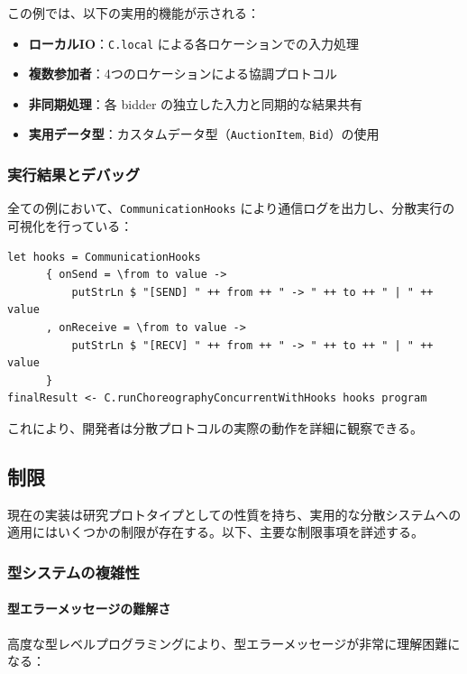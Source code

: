 この例では、以下の実用的機能が示される：
\begin{itemize}
\item \textbf{ローカルIO}：\texttt{C.local} による各ロケーションでの入力処理
\item \textbf{複数参加者}：4つのロケーションによる協調プロトコル
\item \textbf{非同期処理}：各 bidder の独立した入力と同期的な結果共有
\item \textbf{実用データ型}：カスタムデータ型（\texttt{AuctionItem}, \texttt{Bid}）の使用
\end{itemize}

\subsubsection{実行結果とデバッグ}

全ての例において、\texttt{CommunicationHooks} により通信ログを出力し、分散実行の可視化を行っている：

\begin{verbatim}
let hooks = CommunicationHooks
      { onSend = \from to value ->
          putStrLn $ "[SEND] " ++ from ++ " -> " ++ to ++ " | " ++ value
      , onReceive = \from to value ->
          putStrLn $ "[RECV] " ++ from ++ " -> " ++ to ++ " | " ++ value
      }
finalResult <- C.runChoreographyConcurrentWithHooks hooks program
\end{verbatim}

これにより、開発者は分散プロトコルの実際の動作を詳細に観察できる。

\subsection{制限}
\label{sect:impl-limitation}

現在の実装は研究プロトタイプとしての性質を持ち、実用的な分散システムへの適用にはいくつかの制限が存在する。以下、主要な制限事項を詳述する。

\subsubsection{型システムの複雑性}

\paragraph{型エラーメッセージの難解さ}
高度な型レベルプログラミングにより、型エラーメッセージが非常に理解困難になる：

